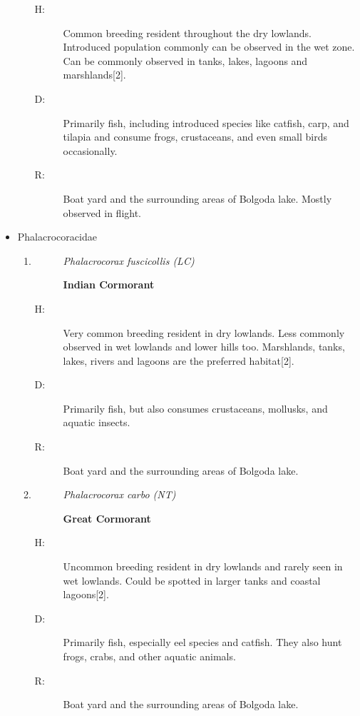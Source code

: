 \begin{itemize}
\begin{enumerate}
\begin{description}%
\item[H: ]%
Common breeding resident throughout the dry lowlands. Introduced population commonly can be observed in the wet zone.  Can be commonly observed in tanks, lakes, lagoons and marshlands{[}2{]}.%
\item[D: ]%
Primarily fish, including introduced species like catfish, carp, and tilapia and consume frogs, crustaceans, and even small birds occasionally.%
\item[R: ]%
Boat yard and the surrounding areas of Bolgoda lake. Mostly observed in flight.%
\end{description}%
\end{enumerate}%
\item%
Phalacrocoracidae%
\begin{enumerate}%
\item%
\begin{description}%
\item[]%
\textit{Phalacrocorax fuscicollis (LC)}%
\item[]%
\textbf{Indian Cormorant}%
\end{description}%
\begin{description}%
\item[H: ]%
Very common breeding resident in dry lowlands. Less commonly observed in wet lowlands and lower hills too. Marshlands, tanks, lakes, rivers and lagoons are the preferred habitat{[}2{]}.%
\item[D: ]%
Primarily fish, but also consumes crustaceans, mollusks, and aquatic insects.%
\item[R: ]%
Boat yard and the surrounding areas of Bolgoda lake.%
\end{description}%
\item%
\begin{description}%
\item[]%
\textit{Phalacrocorax carbo (NT)}%
\item[]%
\textbf{Great Cormorant}%
\end{description}%
\begin{description}%
\item[H: ]%
Uncommon breeding resident in dry lowlands and rarely seen in wet lowlands. Could be spotted in larger tanks and coastal lagoons{[}2{]}.%
\item[D: ]%
Primarily fish, especially eel species and catfish. They also hunt frogs, crabs, and other aquatic animals.%
\item[R: ]%
Boat yard and the surrounding areas of Bolgoda lake.%

\end{description}
\end{enumerate}
\end{itemize}
